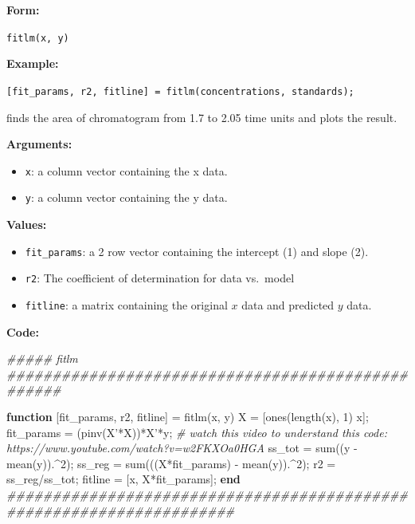 \documentclass[]{tufte-book}
\newenvironment{Shaded}{}{}
\newcommand{\CommentTok}[1]{\textcolor[rgb]{0.38,0.63,0.69}{\textit{#1}}}
\newcommand{\ControlFlowTok}[1]{\textcolor[rgb]{0.00,0.44,0.13}{\textbf{#1}}}
\newcommand{\FloatTok}[1]{\textcolor[rgb]{0.25,0.63,0.44}{#1}}
\newcommand{\FunctionTok}[1]{\textcolor[rgb]{0.02,0.16,0.49}{#1}}
\newcommand{\NormalTok}[1]{#1}
\newcommand{\OperatorTok}[1]{\textcolor[rgb]{0.40,0.40,0.40}{#1}}
\begin{document}
\textbf{Form:}

\texttt{fitlm(x,\ y)}

\textbf{Example:}

\texttt{{[}fit\_params,\ r2,\ fitline{]}\ =\ fitlm(concentrations,\ standards\textquotesingle{});}

finds the area of chromatogram from 1.7 to 2.05 time units and plots the result.

\textbf{Arguments:}

\begin{itemize}
\item
  \texttt{x}: a column vector containing the x data.
\item
  \texttt{y}: a column vector containing the y data.
\end{itemize}

\textbf{Values:}

\begin{itemize}
\item
  \texttt{fit\_params}: a 2 row vector containing the intercept (1) and slope (2).
\item
  \texttt{r2}: The coefficient of determination for data vs.~model
\item
  \texttt{fitline}: a matrix containing the original \(x\) data and predicted \(y\) data.
\end{itemize}

\textbf{Code:}

\begin{Shaded}
\begin{Highlighting}[]
\CommentTok{#####   fitlm   ##################################################}

\ControlFlowTok{function}\NormalTok{ [fit_params}\OperatorTok{,}\NormalTok{ r2}\OperatorTok{,}\NormalTok{ fitline] }\OperatorTok{=}\NormalTok{ fitlm(x}\OperatorTok{,}\NormalTok{ y)}
\NormalTok{    X }\OperatorTok{=}\NormalTok{ [}\FunctionTok{ones}\NormalTok{(}\FunctionTok{length}\NormalTok{(x)}\OperatorTok{,} \FloatTok{1}\NormalTok{) x]}\OperatorTok{;}
\NormalTok{    fit_params }\OperatorTok{=}\NormalTok{ (}\FunctionTok{pinv}\NormalTok{(X}\OperatorTok{'*}\NormalTok{X))}\OperatorTok{*}\NormalTok{X}\OperatorTok{'*}\NormalTok{y}\OperatorTok{;}
    \CommentTok{# watch this video to understand this code: https://www.youtube.com/watch?v=w2FKXOa0HGA}
\NormalTok{    ss_tot }\OperatorTok{=} \FunctionTok{sum}\NormalTok{((y }\OperatorTok{-} \FunctionTok{mean}\NormalTok{(y))}\OperatorTok{.^}\FloatTok{2}\NormalTok{)}\OperatorTok{;}
\NormalTok{    ss_reg }\OperatorTok{=} \FunctionTok{sum}\NormalTok{(((X}\OperatorTok{*}\NormalTok{fit_params) }\OperatorTok{-} \FunctionTok{mean}\NormalTok{(y))}\OperatorTok{.^}\FloatTok{2}\NormalTok{)}\OperatorTok{;}
\NormalTok{    r2 }\OperatorTok{=}\NormalTok{ ss_reg}\OperatorTok{/}\NormalTok{ss_tot}\OperatorTok{;}
\NormalTok{    fitline }\OperatorTok{=}\NormalTok{ [x}\OperatorTok{,}\NormalTok{ X}\OperatorTok{*}\NormalTok{fit_params]}\OperatorTok{;}
\ControlFlowTok{end}
\CommentTok{#####################################################################}
\end{Highlighting}
\end{Shaded}
\end{document}
